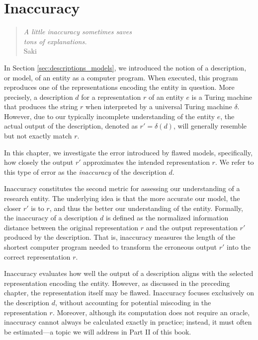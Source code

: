 %
%


\chapter{Inaccuracy}
\label{chap:Error}

\begin{quote}
\begin{flushright}
\emph{A little inaccuracy sometimes saves\\
tons of explanations.}\\
Saki
\end{flushright}
\end{quote}
\bigskip

In Section \ref{sec:descriptions_models}, we introduced the notion of a description, or model, of an entity as a computer program. When executed, this program reproduces one of the representations encoding the entity in question. More precisely, a description $d$ for a representation $r$ of an entity $e$ is a Turing machine that produces the string $r$ when interpreted by a universal Turing machine $\delta$. However, due to our typically incomplete understanding of the entity $e$, the actual output of the description, denoted as $r' = \delta(d)$, will generally resemble but not exactly match $r$.

In this chapter, we investigate the error introduced by flawed models, specifically, how closely the output $r'$ approximates the intended representation $r$. We refer to this type of error as the \emph{inaccuracy} of the description $d$.

Inaccuracy constitutes the second metric for assessing our understanding of a research entity. The underlying idea is that the more accurate our model, the closer $r'$ is to $r$, and thus the better our understanding of the entity. Formally, the inaccuracy of a description $d$ is defined as the normalized information distance between the original representation $r$ and the output representation $r'$ produced by the description. That is, inaccuracy measures the length of the shortest computer program needed to transform the erroneous output $r'$ into the correct representation $r$.

Inaccuracy evaluates how well the output of a description aligns with the selected representation encoding the entity. However, as discussed in the preceding chapter, the representation itself may be flawed. Inaccuracy focuses exclusively on the description $d$, without accounting for potential miscoding in the representation $r$. Moreover, although its computation does not require an oracle, inaccuracy cannot always be calculated exactly in practice; instead, it must often be estimated—a topic we will address in Part II of this book.

